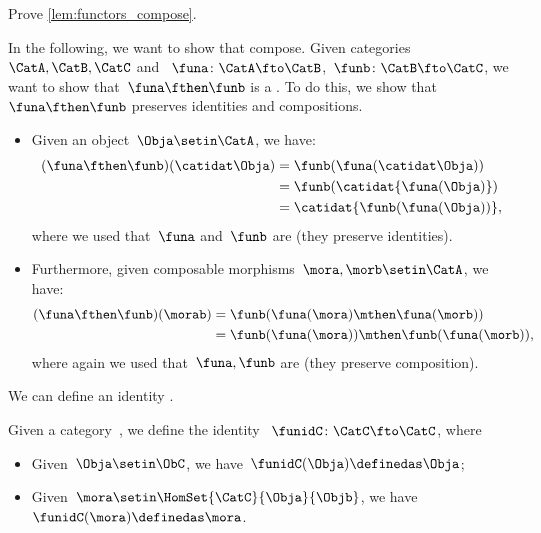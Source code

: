 \begin{exercise}
    Prove \cref{lem:functors_compose}.
\end{exercise}
\begin{solution}
    In the following, we want to show that  compose.
    Given categories~$\CatA,\CatB,\CatC$ and ~$\funa\colon \CatA\fto \CatB$,~$\funb \colon \CatB\fto \CatC$, we want to show that~$\funa\fthen\funb$ is a .
    To do this, we show that~$\funa\fthen\funb$ preserves identities and compositions.
    \begin{itemize}
        \item Given an object~$\Obja\setin \CatA$, we have:
              \begin{equation}
                  \begin{aligned}
                      (\funa\fthen\funb)(\catidat\Obja)
                       & =\funb(\funa(\catidat\Obja)) \\
                       & =\funb(\catidat{\funa(\Obja)}) \\
                       & =\catidat{\funb(\funa(\Obja))},
                  \end{aligned}
              \end{equation}
              where we used that~$\funa$ and~$\funb$ are  (they preserve identities).
        \item Furthermore, given composable morphisms~$\mora,\morb\setin \CatA$, we have:
              \begin{equation}
                  \begin{aligned}
                      (\funa\fthen\funb)(\morab)
                       & =\funb(\funa(\mora)\mthen \funa(\morb)) \\
                       & =\funb(\funa(\mora))\mthen \funb(\funa(\morb)),
                  \end{aligned}
              \end{equation}
              where again we used that~$\funa,\funb$ are  (they preserve composition).
    \end{itemize}
\end{solution}

We can define an identity .

\begin{ctdefinition}
    \label{def:identity_functor}
    Given a category~\CatC, we define the identity  ~$\funidC\colon \CatC \fto \CatC$, where
    \begin{itemize}
        \item Given~$\Obja\setin \ObC$, we have~$\funidC(\Obja)\definedas \Obja$;
        \item Given~$\mora \setin \HomSet{\CatC}{\Obja}{\Objb}$, we have~$\funidC(\mora)\definedas \mora$.
    \end{itemize}
\end{ctdefinition}

